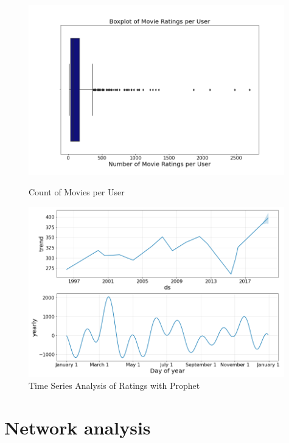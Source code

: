 \documentclass[12pt]{article}
\numberwithin{equation}{section}
\begin{document}
\begin{figure}[h!]
    \begin{minipage}[b]{0.49\linewidth}
         \centering
  	\includegraphics[width=0.99\textwidth]{count_user.png}
  	\caption{Count of Movies per User}
  	\label{fig:count_user}
    \end{minipage}
    \hspace{0.01cm}
    \begin{minipage}[b]{0.49\linewidth}
        \centering
  	\includegraphics[width=0.99\textwidth]{prophet.png}
  	\caption{Time Series Analysis of Ratings with Prophet}
  	\label{fig:ranking_ts}
    \end{minipage}
\end{figure}

\section{Network analysis}
\end{document}
